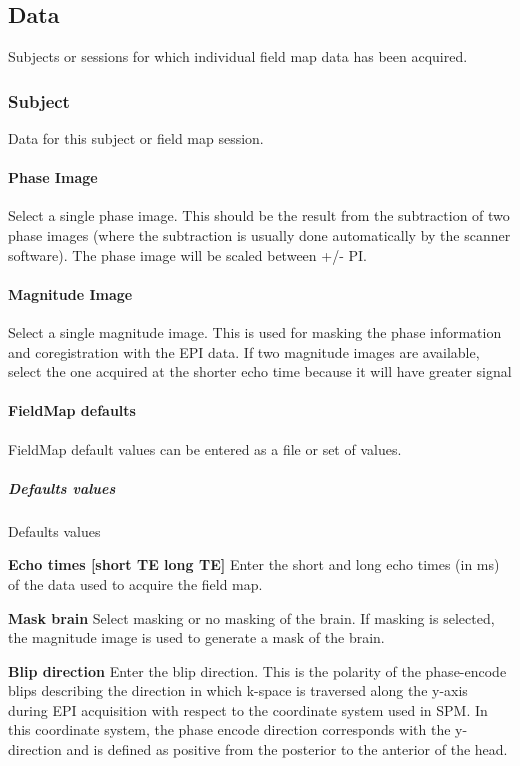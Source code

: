 \subsection{Data}
Subjects or sessions for which individual field map data has been acquired.


\subsubsection{Subject}
Data for this subject or field map session.


\paragraph{Phase Image}
Select a single phase image. This should be the result from the subtraction of two phase images (where the subtraction is usually done automatically by the scanner software). The phase image will be scaled between +/- PI.


\paragraph{Magnitude Image}
Select a single magnitude image. This is used for masking the phase information and coregistration with the EPI data. If two magnitude images are available, select the one acquired at the shorter echo time because it will have greater signal


\paragraph{FieldMap defaults}
FieldMap default values can be entered as a file or set of values.


\subparagraph{Defaults values}
Defaults values


\textbf{Echo times [short TE long TE]}
Enter the short and long echo times (in ms) of the data used to acquire the field map.


\textbf{Mask brain}
Select masking or no masking of the brain. If masking is selected, the magnitude image is used to generate a mask of the brain.


\textbf{Blip direction}
Enter the blip direction. This is the polarity of the phase-encode blips describing the direction in which k-space is traversed along the y-axis during EPI acquisition with respect to the coordinate system used in SPM. In this coordinate system, the phase encode direction corresponds with the y-direction and is defined as positive from the posterior to the anterior of the head.

